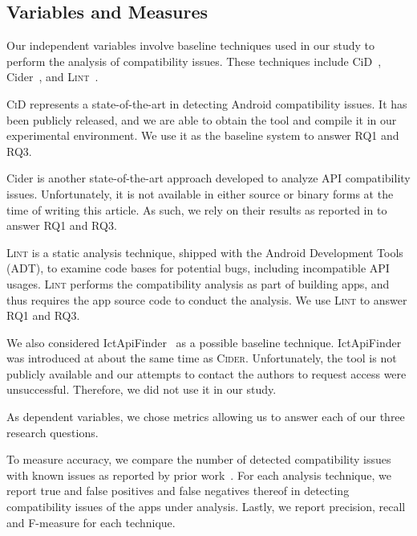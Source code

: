 \subsection{Variables and Measures}

Our independent variables involve baseline techniques used
in our study to perform the analysis of compatibility issues.
These techniques include {\sc CiD}~\cite{lili2018cid}, {\sc
Cider}~\cite{huang2018understanding}, and
\textsc{Lint}~\cite{linttips}.

\textsc{CiD} represents a state-of-the-art in detecting
Android compatibility issues. It has been publicly released,
and we are able to obtain the tool and compile it in our
experimental environment.  We use it as the baseline system
to answer RQ1 and RQ3.

{\sc Cider} is another state-of-the-art approach developed to analyze API compatibility issues. Unfortunately, it is not available in  either source or binary forms at the
time of writing this article.  As such, we rely on their results as reported in \cite{huang2018understanding} to answer RQ1 and RQ3.

\textsc{Lint} is a static analysis technique, shipped
with the Android Development Tools (ADT), to examine
code bases for potential bugs, including incompatible
API usages.  \textsc{Lint} performs the compatibility
analysis as part of building apps, and thus requires the app source code to conduct the analysis. We use \textsc{Lint} to answer RQ1 and RQ3.

We also considered {\sc
IctApiFinder}~\cite{he2018understanding} as a possible
baseline technique. {\sc IctApiFinder} was introduced
at about the same time as \textsc{Cider}.
Unfortunately, the tool is not publicly available and
our attempts to contact the authors to request access
were unsuccessful. Therefore, we did not use it in our
study.


 As dependent variables, we chose
metrics allowing us to answer each of our three research
questions.

To measure accuracy, we compare the number of detected compatibility issues with known issues as reported by prior work~\cite{huang2018understanding,lili2018cid}. For each analysis technique, we report true and false positives and false
negatives thereof in detecting compatibility issues of the apps under analysis. Lastly, we report precision, recall and F-measure for each technique.


